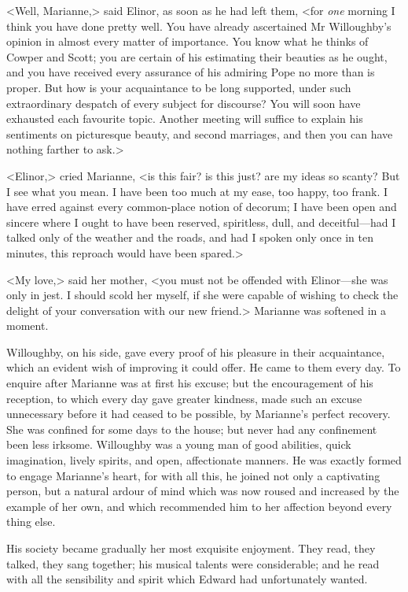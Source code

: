 <Well, Marianne,> said Elinor, as soon as he had left them, <for \textit{one} morning I think you have done pretty well. You have already ascertained Mr Willoughby's opinion in almost every matter of importance. You know what he thinks of Cowper and Scott; you are certain of his estimating their beauties as he ought, and you have received every assurance of his admiring Pope no more than is proper. But how is your acquaintance to be long supported, under such extraordinary despatch of every subject for discourse? You will soon have exhausted each favourite topic. Another meeting will suffice to explain his sentiments on picturesque beauty, and second marriages, and then you can have nothing farther to ask.>

<Elinor,> cried Marianne, <is this fair? is this just? are my ideas so scanty? But I see what you mean. I have been too much at my ease, too happy, too frank. I have erred against every common-place notion of decorum; I have been open and sincere where I ought to have been reserved, spiritless, dull, and deceitful—had I talked only of the weather and the roads, and had I spoken only once in ten minutes, this reproach would have been spared.>

<My love,> said her mother, <you must not be offended with Elinor—she was only in jest. I should scold her myself, if she were capable of wishing to check the delight of your conversation with our new friend.> Marianne was softened in a moment.

Willoughby, on his side, gave every proof of his pleasure in their acquaintance, which an evident wish of improving it could offer. He came to them every day. To enquire after Marianne was at first his excuse; but the encouragement of his reception, to which every day gave greater kindness, made such an excuse unnecessary before it had ceased to be possible, by Marianne's perfect recovery. She was confined for some days to the house; but never had any confinement been less irksome. Willoughby was a young man of good abilities, quick imagination, lively spirits, and open, affectionate manners. He was exactly formed to engage Marianne's heart, for with all this, he joined not only a captivating person, but a natural ardour of mind which was now roused and increased by the example of her own, and which recommended him to her affection beyond every thing else.

His society became gradually her most exquisite enjoyment. They read, they talked, they sang together; his musical talents were considerable; and he read with all the sensibility and spirit which Edward had unfortunately wanted.


